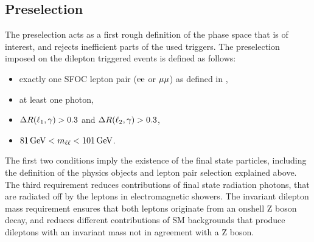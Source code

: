 \subsection{Preselection}
The preselection acts as a first rough definition of the phase space that is of interest, and rejects inefficient parts of the used triggers. The preselection imposed on the dilepton triggered events is defined as follows:
\begin{itemize}
 \item exactly one SFOC lepton pair ($\mathrm{e}\mathrm{e}$ or $\mu\mu$) as defined in ,
 \item at least one photon,
 \item $\Delta R(\ell_1,\gamma)>0.3$ and $\Delta R(\ell_2,\gamma)>0.3$,
 \item $81\,\text{Ge\hspace{-.08em}V}<m_{\ell\ell}<101\,\text{Ge\hspace{-.08em}V}$.
\end{itemize}
The first two conditions imply the existence of the final state particles, including the definition of the physics objects and lepton pair selection explained above. The third requirement reduces contributions of final state radiation photons, that are radiated off by the leptons in electromagnetic showers. The invariant dilepton mass requirement ensures that both leptons originate from an onshell Z boson decay, and reduces different contributions of SM backgrounds that produce dileptons with an invariant mass not in agreement with a Z boson.
